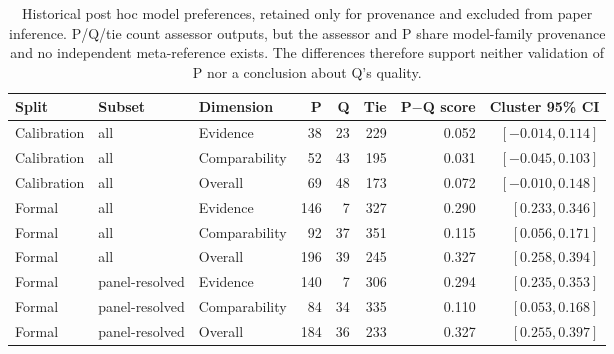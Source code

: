 \begin{table}[t]
\centering
\scriptsize
\setlength{\tabcolsep}{4pt}
\begin{tabular}{lllrrrrr}
\toprule
\textbf{Split} & \textbf{Subset} & \textbf{Dimension} &
\textbf{P} & \textbf{Q} & \textbf{Tie} &
\textbf{P$-$Q score} & \textbf{Cluster 95\% CI} \\
\midrule
Calibration & all & Evidence & 38 & 23 & 229 & 0.052 & $[-0.014,0.114]$ \\
Calibration & all & Comparability & 52 & 43 & 195 & 0.031 & $[-0.045,0.103]$ \\
Calibration & all & Overall & 69 & 48 & 173 & 0.072 & $[-0.010,0.148]$ \\
\midrule
Formal & all & Evidence & 146 & 7 & 327 & 0.290 & $[0.233,0.346]$ \\
Formal & all & Comparability & 92 & 37 & 351 & 0.115 & $[0.056,0.171]$ \\
Formal & all & Overall & 196 & 39 & 245 & 0.327 & $[0.258,0.394]$ \\
\midrule
Formal & panel-resolved & Evidence & 140 & 7 & 306 & 0.294 & $[0.235,0.353]$ \\
Formal & panel-resolved & Comparability & 84 & 34 & 335 & 0.110 & $[0.053,0.168]$ \\
Formal & panel-resolved & Overall & 184 & 36 & 233 & 0.327 & $[0.255,0.397]$ \\
\bottomrule
\end{tabular}
\caption{Historical post hoc model preferences, retained only for provenance
and excluded from paper inference. P/Q/tie count assessor outputs, but the
assessor and P share model-family provenance and no independent meta-reference
exists. The differences therefore support neither validation of P nor a
conclusion about Q's quality.}
\label{tab:v3-quality-gate-details}
\end{table}
